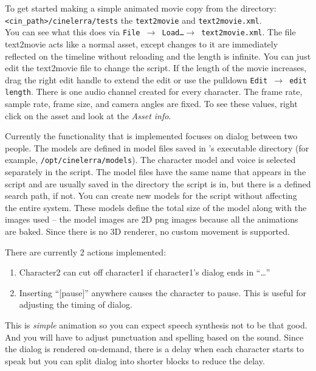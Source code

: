 To get started making a simple animated movie copy from the directory:\\
\texttt{<cin\_path>/cinelerra/tests} the \texttt{text2movie} and \texttt{text2movie.xml}. \\
You can see what this does via \texttt{File $\rightarrow$ Load\dots $\rightarrow$ text2movie.xml}.  The file text2movie acts like a normal asset, except changes to it are immediately reflected on the timeline without reloading and the length is infinite.  You can just edit the text2movie file to change the script.  If the length of the movie increases, drag the right edit handle to extend the edit or use the pulldown \texttt{Edit $\rightarrow$ edit length}. There is one audio channel created for every character.  The frame rate, sample rate, frame size, and camera angles are fixed.  To see these values, right click on the asset and look at the \textit{Asset info}.

Currently the functionality that is implemented focuses on dialog between two people.  The models are defined in model files saved in \CGG{}'s executable directory (for example, \texttt{/opt/cinelerra/models}).  The character model and voice is selected separately in the script.  The model files have the same name that appears in the script and are usually saved in the directory the script is in, but there is a defined search path, if not.  You can create new models for the script without affecting the entire system.  These models define the total size of the model along with the images used -- the model images are 2D png images because all the animations are baked.  Since there is no 3D renderer, no custom movement is supported.

There are currently 2 actions implemented:

\begin{enumerate}
    \item Character2 can cut off character1 if character1's dialog ends in “\dots”
    \item Inserting “[pause]” anywhere causes the character to pause.  This is useful for adjusting the timing of dialog.
\end{enumerate}

This is \textit{simple} animation so you can expect speech synthesis not to be that good.  And you will have to adjust punctuation and spelling based on the sound.  Since the dialog is rendered on-demand, there is a delay when each character starts to speak but you can split dialog into shorter blocks to reduce the delay.


